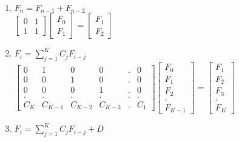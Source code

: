 \begin{enumerate}[label=(\roman*)]
  \item $F_n = F_{n-1} + F_{n-2}$\\

$\begin{bmatrix}
  0 & 1\\
  1 & 1
  \end{bmatrix} 
  \begin{bmatrix}
  F_0\\
  F_1
  \end{bmatrix} =
  \begin{bmatrix}
    F_1\\
    F_2
  \end{bmatrix}$

\item $F_i = \sum_{j=1}^{K} C_j F_{i-j}$\\


{   
  \scriptsize
  $\begin{bmatrix}
    0 & 1 & 0 & 0 & . & 0\\
    0 & 0 & 1 & 0 & . & 0\\
    0 & 0 & 0 & 1 & . & 0\\
    . & . & . & . & . & .\\
    C_K & C_{K-1} & C_{K-2} & C_{K-3} & . & C_{1}
  \end{bmatrix} 
  \begin{bmatrix}
  F_0\\
  F_1\\
  F_2\\
  .\\
  F_{K-1}
  \end{bmatrix} =
  \begin{bmatrix}
    F_1\\
    F_2\\
    F_3\\
    .\\
    F_K
\end{bmatrix}$
}

\item $F_i = \sum_{j=1}^{K} C_j F_{i-j} + D$\\


\end{enumerate}

